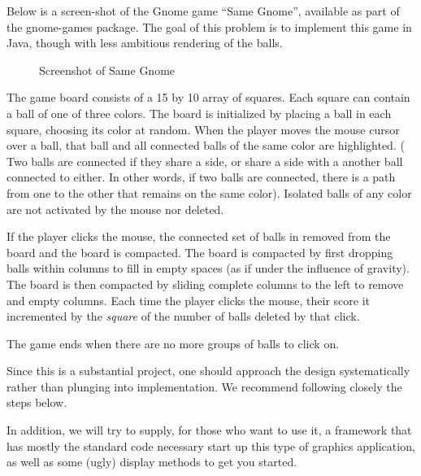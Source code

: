 \documentclass{article}
\newcounter{problem}
\newcounter{step}[problem]
\newcommand {\problem}[1]{\bigskip\noindent{\large\bf Problem \stepcounter{problem} \arabic{problem}: {#1}}}
\begin{document}
\problem{SameJava}

Below is a screen-shot of the Gnome game ``Same Gnome'', available
as part of the gnome-games package. The goal of this problem is
to implement this game in Java, though with less ambitious rendering
of the balls.

\begin{center}
\begin{figure}[h]
\begin{center}
\resizebox{4.0in}{!}{
\texttt{[image: sg.ps]}
}
\caption[Figure 1]{Screenshot of Same Gnome}
\end{center}
\end{figure}
\end{center}

The game board consists of a 15 by 10 array of squares. Each square can
contain a ball of one of three colors. The board is initialized by placing
a ball in each square, choosing its color at random. When the player moves
the mouse cursor over a ball, that ball and all connected balls of
the same color are highlighted. ( Two balls are connected if they share a
side, or share a side with a another ball connected to either. In other
words, if two balls are connected, there is a path from one to the other
that remains on the same color). Isolated balls of any color are not
activated by the mouse nor deleted.

If the player clicks the mouse, the connected set of balls in removed from
the board and the board is compacted. The board is compacted by first
dropping balls within columns to fill in empty spaces (as if under the
influence of gravity). The board is then compacted by sliding complete
columns to the left to remove and empty columns. Each time the player
clicks the mouse, their score it incremented by the {\it square} of the
number of balls deleted by that click.

The game ends when there are no more groups of balls to click on.

\bigskip
{}

Since this is a substantial project, one should approach the design
systematically rather than plunging into implementation. We recommend
following closely the steps below. 

In addition, we will try to supply,
for those who want to use it, a framework that has mostly the
standard code necessary start up this type of graphics application,
as well as some (ugly) display methods to get you started.
\end{document}
